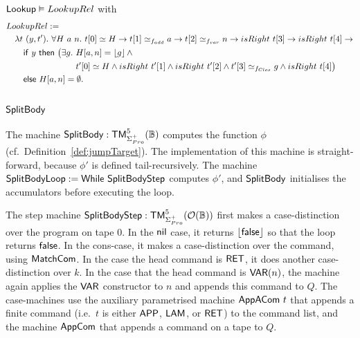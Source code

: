 \begin{lemma}
  \label{lem:Lookup_Realise}
  $\mathsf{Lookup} \mathrel{\vDash} LookupRel$
  with
  \small
  \begin{alignat*}{1}
    & LookupRel := \\
    &\quad \lambda t~(y, t').~\forall H~a~n.~ t[0] \simeq H \rightarrow t[1] \simeq_{f_{add}} a \rightarrow t[2] \simeq_{f_{var}} n \rightarrow isRight~t[3] \rightarrow isRight~t[4] \rightarrow \\
    &\quad\quad \MS{if}~y~\MS{then}~\bigl(\exists g.~H[a,n] = \Some{g} \land \\
    &\quad\quad \phantom{\MS{if}~y~\MS{then}~\bigl(\exists g.~} t'[0] \simeq H \land isRight~t'[1] \land isRight~t'[2] \land t'[3] \simeq_{f_{Clos}} g \land isRight~t[4]\bigr) \\
    &\quad\quad \MS{else}~ H[a,n] = \None.
\end{alignat*}
\end{lemma}


\subsection{$\mathsf{SplitBody}$}
\label{sec:SplitBody}
%

The machine $\mathsf{SplitBody} : \mathsf{TM}_{\Sigma^+_{Pro}}^5(\mathbb{B})$ computes the function $\phi$ (cf.\ Definition~\ref{def:jumpTarget}).  The
implementation of this machine is straight-forward, because $\phi'$ is defined tail-recursively.  The machine
$\mathsf{SplitBodyLoop} := \mathsf{While}~\mathsf{SplitBodyStep}$ computes $\phi'$, and $\mathsf{SplitBody}$ initialises the accumulators before executing the loop.

The step machine $\mathsf{SplitBodyStep} : \mathsf{TM}_{\Sigma^+_{Pro}}^5(\mathcal{O}(\mathbb{B}))$ first makes a case-distinction over the program on tape $0$.  In the
$\mathsf{nil}$ case, it returns $\left\lfloor {\ensuremath{\mathsf{false}}} \right\rfloor$ so that the loop returns $\mathsf{false}$.  In the cons-case, it makes a case-distinction over the command, using
$\mathsf{MatchCom}$.  In the case the head command is $\mathsf{RET}$, it does another case-distinction over $k$.  In the case that the head command is
$\mathsf{VAR}(n)$, the machine again applies the $\mathsf{VAR}$ constructor to $n$ and appends this command to $Q$.  The case-machines use the auxiliary
parametrised machine $\mathsf{AppACom}~t$ that appends a finite command (i.e.\ $t$ is either $\mathsf{APP}$, $\mathsf{LAM}$, or $\mathsf{RET}$) to the command list,
and the machine $\mathsf{AppCom}$ that appends a command on a tape to $Q$.


